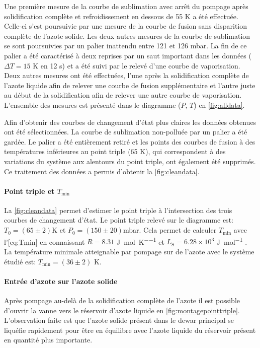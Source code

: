 Une première mesure de la courbe de sublimation avec arrêt du pompage après solidification complète et refroidissement en dessous de 55 \si{\kelvin} a été effectuée. Celle-ci s'est poursuivie par une mesure de la courbe de fusion sans disparition complète de l'azote solide. Les deux autres mesures de la courbe de sublimation se sont poursuivies par un palier inattendu entre 121 et 126 \si{\milli \bar}. La fin de ce palier a été caractérisé à deux reprises par un saut important dans les données (\(\Delta T = 15\) \si{\kelvin} en 12 \si{\second}) et a été suivi par le relevé d'une courbe de vaporisation. Deux autres mesures ont été effectuées, l'une après la solidification complète de l'azote liquide afin de relever une courbe de fusion supplémentaire et l'autre juste au début de la solidification afin de relever une autre courbe de vaporisation. L'ensemble des mesures est présenté dans le diagramme (\(P\), \(T\)) en \autoref{fig:alldata}.

Afin d'obtenir des courbes de changement d'état plus claires les données obtenues ont été sélectionnées. La courbe de sublimation non-polluée par un palier a été gardée. Le palier a été entièrement retiré et les points des courbes de fusion à des températures inférieures au point triple (65 \si{\kelvin}), qui correspondent à des variations du système aux alentours du point triple, ont également été supprimés. Ce traitement des données a permis d'obtenir la \autoref{fig:cleandata}.

\paragraph*{Point triple et \(T_\textrm{min}\)}
La \autoref{fig:cleandata} permet d'estimer le point triple à l'intersection des trois courbes de changement d'état. Le point triple relevé sur le diagramme est: \(T_\textrm{0} = (65 \pm 2)\)\si{\kelvin} et \(P_\textrm{0} = (150 \pm 20)\)\si{\milli \bar}. Cela permet de calculer \(T_\textrm{min}\) avec l'\autoref{eq:Tmin} en connaissant \(R = 8.31\) \si{\joule \per \mole \per \kelvin} et \(L_\textrm{S} = 6.28 \times 10^{3}\) \si{\joule \per \mole} \cite{Azote}.\\
La température minimale atteignable par pompage sur de l'azote avec le système étudié est: \(T_\textrm{min} = (36 \pm 2) \) \si{\kelvin}.

\paragraph*{Entrée d'azote sur l'azote solide}
Après pompage au-delà de la solidification complète de l'azote il est possible d'ouvrir la vanne vers le réservoir d'azote liquide en \autoref{fig:montagepointtriple}. L'observation faite est que l'azote solide présent dans le dewar principal se liquéfie rapidement pour être en équilibre avec l'azote liquide du réservoir présent en quantité plus importante.
